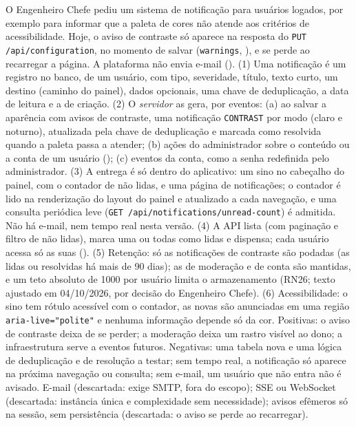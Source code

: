 {O Engenheiro Chefe pediu um sistema de notificação para usuários logados, por exemplo para informar que a paleta de cores não atende aos critérios de acessibilidade. Hoje, o aviso de contraste só aparece na resposta do \texttt{PUT /api/configuration}, no momento de salvar (\texttt{warnings}, ), e se perde ao recarregar a página. A plataforma não envia e-mail ().}
{(1) Uma notificação é um registro no banco, de um usuário, com tipo, severidade, título, texto curto, um destino (caminho do painel), dados opcionais, uma chave de deduplicação, a data de leitura e a de criação. (2) O \emph{servidor} as gera, por eventos: (a) ao salvar a aparência com avisos de contraste, uma notificação \texttt{CONTRAST} por modo (claro e noturno), atualizada pela chave de deduplicação e marcada como resolvida quando a paleta passa a atender; (b) ações do administrador sobre o conteúdo ou a conta de um usuário (); (c) eventos da conta, como a senha redefinida pelo administrador. (3) A entrega é só dentro do aplicativo: um sino no cabeçalho do painel, com o contador de não lidas, e uma página de notificações; o contador é lido na renderização do layout do painel e atualizado a cada navegação, e uma consulta periódica leve (\texttt{GET /api/notifications/unread-count}) é admitida. Não há e-mail,  nem tempo real nesta versão. (4) A API lista (com paginação e filtro de não lidas), marca uma ou todas como lidas e dispensa; cada usuário acessa só as suas (). (5) Retenção: só as notificações de contraste são podadas (as lidas ou resolvidas há mais de 90 dias); as de moderação e de conta são mantidas, e um teto absoluto de 1000 por usuário limita o armazenamento (RN26; texto ajustado em 04/10/2026, por decisão do Engenheiro Chefe). (6) Acessibilidade: o sino tem rótulo acessível com o contador, as novas são anunciadas em uma região \texttt{aria-live="polite"} e nenhuma informação depende só da cor.}
{Positivas: o aviso de contraste deixa de se perder; a moderação deixa um rastro visível ao dono; a infraestrutura serve a eventos futuros. Negativas: uma tabela nova e uma lógica de deduplicação e de resolução a testar; sem tempo real, a notificação só aparece na próxima navegação ou consulta; sem e-mail, um usuário que não entra não é avisado.}
{E-mail (descartada: exige SMTP, fora do escopo); SSE ou WebSocket (descartada: instância única e complexidade sem necessidade); avisos efêmeros só na sessão, sem persistência (descartada: o aviso se perde ao recarregar).}

